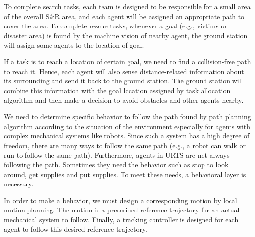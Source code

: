 \documentclass{ieeeaccess}
\begin{document}
To complete search tasks, each team is designed to be responsible for a small area of the overall S\&R area, and each agent will be assigned an appropriate path to cover the area. To complete rescue tasks, whenever a goal (e.g., victims or disaster area) is found by the machine vision of nearby agent, the ground station will assign some agents to the location of goal. 

If a task is to reach a location of certain goal, we need to find a collision-free path to reach it. 
Hence, each agent will also sense distance-related information about its surrounding and send it back to the ground station. The ground station will combine this information with the goal location assigned by task allocation algorithm and then make a decision to avoid obstacles and other agents nearby.

We need to determine specific behavior to follow the path found by path planning algorithm according to the situation of the environment especially for agents with complex mechanical systems like robots. Since such a system has a high degree of freedom, there are many ways to follow the same path (e.g., a robot can walk or run to follow the same path). Furthermore, agents in URTS are not always following the path. Sometimes they need the behavior such as stop to look around, get supplies and put supplies. To meet these needs, a behavioral layer is necessary.

In order to make a behavior, we must design a corresponding motion by local motion planning. The motion is a prescribed reference trajectory for an actual mechanical system to follow. Finally, a tracking controller is designed for each agent to follow this desired reference trajectory.
\end{document}
